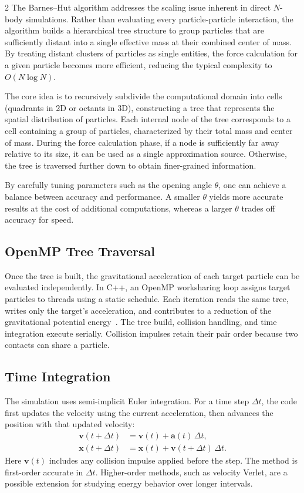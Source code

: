 \documentclass[a4paper, 12pt, oneside, onecolumn]{article}
\begin{document}
\begin{multicols}{2}
The Barnes–Hut algorithm addresses the scaling issue inherent in direct $N$-body simulations. Rather than evaluating every particle-particle interaction, the algorithm builds a hierarchical tree structure to group particles that are sufficiently distant into a single effective mass at their combined center of mass. By treating distant clusters of particles as single entities, the force calculation for a given particle becomes more efficient, reducing the typical complexity to $O(N \log N)$.

The core idea is to recursively subdivide the computational domain into cells (quadrants in 2D or octants in 3D), constructing a tree that represents the spatial distribution of particles. Each internal node of the tree corresponds to a cell containing a group of particles, characterized by their total mass and center of mass. During the force calculation phase, if a node is sufficiently far away relative to its size, it can be used as a single approximation source. Otherwise, the tree is traversed further down to obtain finer-grained information.

By carefully tuning parameters such as the opening angle $\theta$, one can achieve a balance between accuracy and performance. A smaller $\theta$ yields more accurate results at the cost of additional computations, whereas a larger $\theta$ trades off accuracy for speed.





\subsection{OpenMP Tree Traversal}

Once the tree is built, the gravitational acceleration of each target particle can be evaluated independently. In C++, an OpenMP worksharing loop assigns target particles to threads using a static schedule. Each iteration reads the same tree, writes only the target's acceleration, and contributes to a reduction of the gravitational potential energy~\cite{openmp_api_52}. The tree build, collision handling, and time integration execute serially. Collision impulses retain their pair order because two contacts can share a particle.

\subsection{Time Integration}

The simulation uses semi-implicit Euler integration. For a time step $\Delta t$, the code first updates the velocity using the current acceleration, then advances the position with that updated velocity:
\begin{align}
\mathbf{v}(t+\Delta t) &= \mathbf{v}(t) + \mathbf{a}(t)\,\Delta t, \\
\mathbf{x}(t+\Delta t) &= \mathbf{x}(t) + \mathbf{v}(t+\Delta t)\,\Delta t.
\end{align}
Here $\mathbf{v}(t)$ includes any collision impulse applied before the step. The method is first-order accurate in $\Delta t$. Higher-order methods, such as velocity Verlet, are a possible extension for studying energy behavior over longer intervals.


\end{multicols}
\end{document}
